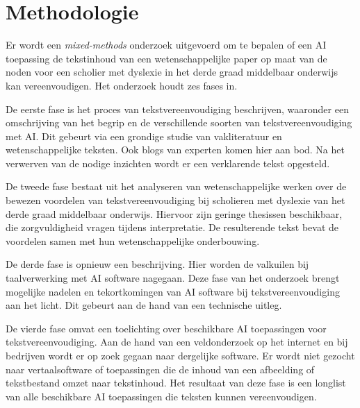 
\section{Methodologie}%
\label{sec:methodologie}

Er wordt een \textit{mixed-methods} onderzoek uitgevoerd om te bepalen of een AI toepassing de tekstinhoud van een wetenschappelijke paper op maat van de noden voor een scholier met dyslexie in het derde graad middelbaar onderwijs kan vereenvoudigen. Het onderzoek houdt zes fases in. 

De eerste fase is het proces van tekstvereenvoudiging beschrijven, waaronder een omschrijving van het begrip en de verschillende soorten van tekstvereenvoudiging met AI. Dit gebeurt via een grondige studie van vakliteratuur en wetenschappelijke teksten. Ook blogs van experten komen hier aan bod. Na het verwerven van de nodige inzichten wordt er een verklarende tekst opgesteld.

De tweede fase bestaat uit het analyseren van wetenschappelijke werken over de bewezen voordelen van tekstvereenvoudiging bij scholieren met dyslexie van het derde graad middelbaar onderwijs. Hiervoor zijn geringe thesissen beschikbaar, die zorgvuldigheid vragen tijdens interpretatie. De resulterende tekst bevat de voordelen samen met hun wetenschappelijke onderbouwing.

De derde fase is opnieuw een beschrijving. Hier worden de valkuilen bij taalverwerking met AI software nagegaan. Deze fase van het onderzoek brengt mogelijke nadelen en tekortkomingen van AI software bij tekstvereenvoudiging aan het licht. Dit gebeurt aan de hand van een technische uitleg.

De vierde fase omvat een toelichting over beschikbare AI toepassingen voor tekstvereenvoudiging. Aan de hand van een veldonderzoek op het internet en bij bedrijven wordt er op zoek gegaan naar dergelijke software. Er wordt niet gezocht naar vertaalsoftware of toepassingen die de inhoud van een afbeelding of tekstbestand omzet naar tekstinhoud. Het resultaat van deze fase is een longlist van alle beschikbare AI toepassingen die teksten kunnen vereenvoudigen.

